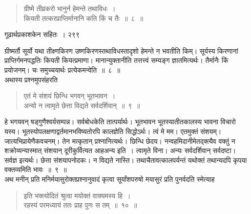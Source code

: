 \documentclass[11pt, openany]{book}
\begin{document}


\begin{quote}
 {\ssi ग्रीष्मे तीव्रकरो भानुर्न हेमन्ते तथाविधः~।\\
कियती तत्करप्राप्तिर्मानानि कति किं च तैः~॥~८~॥}
\end{quote}



\newpage


\hspace{3cm} गूढार्थप्रकाशकेन सहितः~। \hfill २९९
\vspace{1cm}


 ग्रीष्मर्तौ सूर्यो यथा तीक्ष्णकिरण उष्णकिरणस्तथाविधस्तादृशो हेमन्ते न भवतीति किम्। सूर्यस्य किरणानां प्राप्तिर्गमनपद्धतिः कियती कियत्प्रमाणा। मानान्युक्तानीति तत्तत्त्वं सम्यङ्ग ज्ञातमित्यर्थः। तैर्मानैः किं प्रयोजनम्। चः समुच्चयार्थः प्रत्येकमन्वेति~॥~८~॥\\
 \noindent अथास्य प्रश्नमुपसंहरति\textendash
 


\begin{quote}
 {\ssi एतं मे संशयं छिन्धि भगवन् भूतभावन~।\\
अन्यो न त्वामृते छेत्ता विद्यते सर्वदर्शिवान्~॥~९~॥ }
\end{quote}

 हे भगयवन् षड्गुणैश्वर्यसम्पन्न। सर्वबोधकेति तात्पर्यार्थः। भूतभावन भूतस्यातीतकालस्य भावना विचारो यस्य। भूतस्योपलक्षणाद्वर्तमानभविष्यतोरपि कालज्ञेति सिद्धोऽर्थः। त्वं मे मम। एतमुक्तं संशयम्। जात्यभिप्रायेणैकवचनम्। तेन मत्कृतान् प्रश्नानित्यर्थः। छिन्धि छेदय। नन्वहमिदानीमेतद्क्त्यैव वक्तुं न शक्रोव्यन्यास्मात् संशयान् दूरीकुर्वित्यत आह\textendash अन्य इति~। त्वामृते विना। अन्यः सर्वदर्शिवान् सर्वदष्टा। सर्वज्ञ इत्यर्थः। छेत्ता संशयापनोदकः। न विद्यते नास्ति। तथाचैतावत्कालपर्यन्तं यथोक्तं तथान्यदपि कृपया वक्तव्यमिति भावः~॥~९~॥\\
\noindent अथ मनीन् प्रति मनिर्मयासुरोक्तप्रश्नानुवादं कृत्वा सूर्यांशपरुषो मयासुरं प्रति पुनर्वदति स्मेत्याह\textendash 



\begin{quote}
 {\ssi इति भक्त्योदितं श्रुत्वा मयोक्तं वाक्यमस्य हि~।\\
रहस्यं परमध्यायं ततः प्राह पुनः स तम्~॥~१०~॥}
\end{quote}
\end{document}
